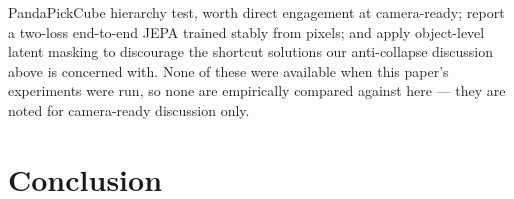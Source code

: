 \documentclass{article}
\begin{document}
PandaPickCube hierarchy test, worth direct engagement at camera-ready;
\citet{maes2026leworldmodel} report a two-loss end-to-end JEPA trained stably
from pixels; and \citet{nam2026causaljepa} apply object-level latent masking to
discourage the shortcut solutions our anti-collapse discussion above is
concerned with. None of these were available when this paper's experiments were
run, so none are empirically compared against here --- they are noted for
camera-ready discussion only.

\section{Conclusion}
\label{sec:conclusion}
\end{document}

